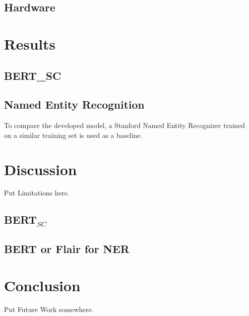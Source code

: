 \documentclass{article}
\theoremstyle{definition}
\theoremstyle{remark}
\begin{document}
\subsection{Hardware}
\section{Results}
\subsection{BERT_{SC}}
\subsection{Named Entity Recognition}

To compare the developed model, a Stanford Named Entity Recognizer \cite{stanfordNER} trained on a similar training set is used as a baseline.


\section{Discussion}
Put Limitations here.
\subsection{BERT$_{SC}$}
\subsection{BERT or Flair for NER}

\section{Conclusion}
Put Future Work somewhere.
\end{document}
